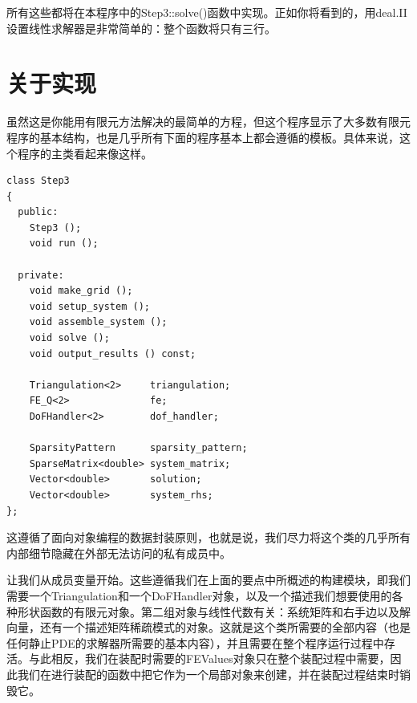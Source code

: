 \documentclass[nofonts]{ctexart} %
\begin{document}
所有这些都将在本程序中的Step3::solve()函数中实现。正如你将看到的，用deal.II设置线性求解器是非常简单的：整个函数将只有三行。
\section{关于实现}
虽然这是你能用有限元方法解决的最简单的方程，但这个程序显示了大多数有限元程序的基本结构，也是几乎所有下面的程序基本上都会遵循的模板。具体来说，这个程序的主类看起来像这样。

\begin{lstlisting}
class Step3
{
  public:
    Step3 ();
    void run ();
 
  private:
    void make_grid ();
    void setup_system ();
    void assemble_system ();
    void solve ();
    void output_results () const;
 
    Triangulation<2>     triangulation;
    FE_Q<2>              fe;
    DoFHandler<2>        dof_handler;
 
    SparsityPattern      sparsity_pattern;
    SparseMatrix<double> system_matrix;
    Vector<double>       solution;
    Vector<double>       system_rhs;
};

\end{lstlisting}





这遵循了面向对象编程的数据封装原则，也就是说，我们尽力将这个类的几乎所有内部细节隐藏在外部无法访问的私有成员中。

让我们从成员变量开始。这些遵循我们在上面的要点中所概述的构建模块，即我们需要一个Triangulation和一个DoFHandler对象，以及一个描述我们想要使用的各种形状函数的有限元对象。第二组对象与线性代数有关：系统矩阵和右手边以及解向量，还有一个描述矩阵稀疏模式的对象。这就是这个类所需要的全部内容（也是任何静止PDE的求解器所需要的基本内容），并且需要在整个程序运行过程中存活。与此相反，我们在装配时需要的FEValues对象只在整个装配过程中需要，因此我们在进行装配的函数中把它作为一个局部对象来创建，并在装配过程结束时销毁它。
\end{document}
